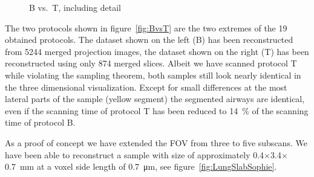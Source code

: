 \begin{figure}
{			}%
	\caption{B vs.\ T, including detail}
	\label{fig:BvsT2}
\end{figure}
\cbend

The two protocols shown in figure~\ref{fig:BvsT} are the two extremes of the 19 obtained protocols. The dataset shown on the left (B) has been reconstructed from 5244 merged projection images, the dataset shown on the right (T) has been reconstructed using only 874 merged slices. Albeit we have scanned protocol T while violating the sampling theorem, both samples still look nearly identical in the three dimensional visualization. Except for small differences at the most lateral parts of the sample (yellow segment) the segmented airways are identical, even if the scanning time of protocol T has been reduced to \SI{14}{\percent} of the scanning time of protocol B.

As a proof of concept we have extended the FOV from three to five subscans. We have been able to reconstruct a sample with size of approximately 0.4\(\times\)3.4\(\times\)\SI{0.7}{\milli\meter} at a voxel side length of \SI{0.7}{\micro\meter}, see figure~\ref{fig:LungSlabSophie}.

